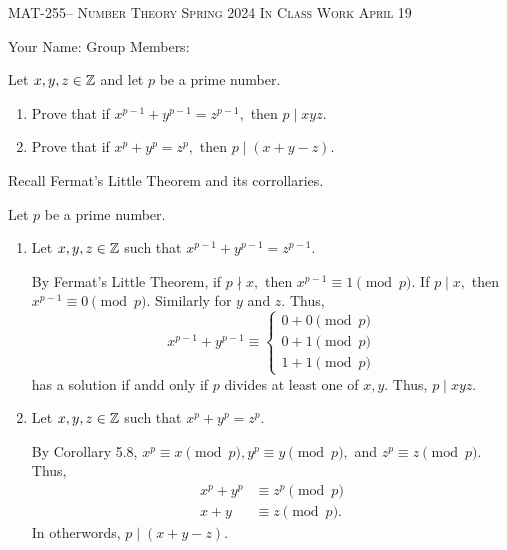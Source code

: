 \documentclass[handout]{ximera}
\date{April 19, 2024}
\begin{document}
\handoutAbstract
\maketitle
 	\begin{center}%
    		{\large \scshape MAT-255-- Number Theory 
			\hfill Spring 2024 
			\hfill In Class Work April 19}%
    
		{\large Your Name: \hrulefill \quad 
			Group Members:\hrulefill \quad 
			\hrulefill
			\par}%
 	\end{center}%
	 

\begin{br}
    Let $x,y,z\in\mathbb Z$ and let $p$ be a prime number.
    
    \begin{enumerate}
        \item Prove that if $x^{p-1}+y^{p-1}=z^{p-1},$ then $p\mid xyz.$
        \item Prove that if $x^{p}+y^{p}=z^{p},$ then $p\mid (x+y-z).$
    \end{enumerate}
    \begin{hint}
        Recall Fermat's Little Theorem and its corrollaries.
    \end{hint}

    \begin{solution}
        Let  $p$ be a prime number.

        \begin{enumerate}
            \item Let $x,y,z\in\mathbb Z$ such that $x^{p-1}+y^{p-1}=z^{p-1}.$ 
            
            By Fermat's Little Theorem, if $p\nmid x,$ then $x^{p-1}\equiv 1\pmod{p}.$ If $p\mid x,$ then $x^{p-1}\equiv 0\pmod{p}.$ Similarly for $y$ and $z.$ Thus, 
            \[x^{p-1}+y^{p-1}\equiv 
                \begin{cases}
                    0 + 0 \pmod{p}\\
                    0 + 1 \pmod{p}\\
                    1 + 1 \pmod{p}
                \end{cases}
            \]
            has a solution if andd only if $p$ divides at least one of $x,y$. Thus, $p\mid xyz.$
            \item Let $x,y,z\in\mathbb Z$ such that $x^{p}+y^{p}=z^{p}.$ 
            
            By Corollary 5.8, $x^{p}\equiv x\pmod{p},  y^p\equiv y\pmod{p},$ and $z^p\equiv z \pmod{p}.$ Thus,
            \begin{align*}
                x^{p}+y^{p}& \equiv z^{p}\pmod{p}\\
                x+y& \equiv z\pmod{p}.
            \end{align*}
            In otherwords, $p\mid (x+y-z).$
        \end{enumerate}
    \end{solution}
\end{br}
\end{document}
